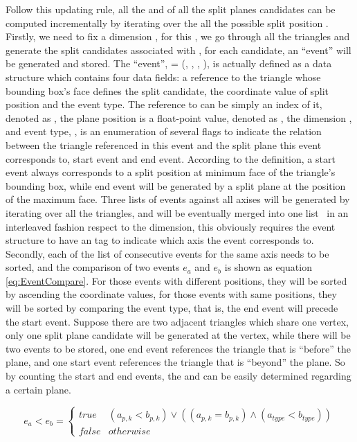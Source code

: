 Follow this updating rule, all the \mynumtrileft and \mynumtriright of all the split planes candidates can be computed incrementally by iterating over the all the possible split position . Firstly, we need to fix a dimension \mydimension, for this \mydimension, we go through all the triangles \mytriangle and generate the split candidates associated with \mytriangle, for each candidate, an ``event'' will be generated and stored. The ``event'', \myevent = (\myeventt, \myeventp, \myeventk, \myeventtype), is actually defined as a data structure which contains four data fields: a reference to the triangle whose bounding box's face defines the split candidate, the coordinate value of split position and the event type. The reference to \mytriangle can be simply an index of it, denoted as \myeventt, the plane position is a float-point value, denoted as \myeventp, the dimension \mydimension, and event type, \myeventtype, is an enumeration of several flags to indicate the relation between the triangle referenced in this event and the split plane this event corresponds to, start event and end event. According to the definition, a start event always corresponds to a split position at minimum face of the triangle's bounding box, while end event will be generated by a split plane at the position of the maximum face. Three lists of events against all axises will be generated by iterating over all the triangles, and will be eventually merged into one list \myeventlist\ in an interleaved fashion respect to the dimension, this obviously requires the event structure to have an tag to indicate which axis the event corresponds to. Secondly, each of the list of consecutive events for the same axis needs to be sorted, and the comparison of two events \(e_{a}\) and \(e_{b}\) is shown as equation \ref{eq:EventCompare}. For those events with different positions, they will be sorted by ascending the coordinate values, for those events with same positions, they will be sorted by comparing the event type, that is, the end event will precede the start event. Suppose there are two adjacent triangles which share one vertex, only one split plane candidate will be generated at the vertex, while there will be two events to be stored, one end event references the triangle that is ``before'' the plane, and one start event references the triangle that is ``beyond'' the plane. So by counting the start and end events, the \mynumtrileft and \mynumtriright can be easily determined regarding a certain plane.

\begin{equation} 
    e_{a} < e_{b} = \left\{ 
        \begin{array}{ll}
            true & (a_{p,k} < b_{p,k}) \vee ( (a_{p,k} = b_{p,k}) \wedge (a_{type} < b_{type}) ) \\
            false & otherwise
        \end{array} \right.
        \label{eq:EventCompare}   
\end{equation} 

